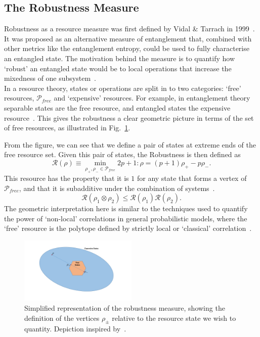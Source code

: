 \documentclass{standalone}
\begin{document}
\subsection{The Robustness Measure}\label{sec:robustnessmeasure}
Robustness as a resource measure was first defined by Vidal \& Tarrach in 1999~\cite{Vidal1999}. It was proposed as an alternative measure of entanglement that, combined with other metrics like the entanglement entropy, could be used to fully characterise an entangled state. The motivation behind the measure is to quantify how `robust' an entangled state would be to local operations that increase the mixedness of one subsystem~\cite{Vidal1999}.\\
In a resource theory, states or operations are split in to two categories: `free' resources, $\mathcal{P}_{free}$ and `expensive' resources. For example, in entanglement theory separable states are the free resource, and entangled states the expensive resource~\cite{Vidal1999}. This gives the robustness a clear geometric picture in terms of the set of free resources, as illustrated in Fig.~\ref{fig:robustshapes}.
\par
From the figure, we can see that we define a pair of states at extreme ends of the free resource set. Given this pair of states, the Robustness is then defined as~\cite{Vidal1999}
\begin{equation}\label{eq:robustness}
    \mathcal{R}(\rho)\equiv\min_{\rho_{+},\rho_{-}\in\mathcal{P}_{free}} 2p+1 : \rho = \left(p+1\right)\rho_{+} - p\rho_{-}.
\end{equation}
This resource has the property that it is $1$ for any state that forms a vertex of $\mathcal{P}_{free}$, and that it is subadditive under the combination of systems~\cite{Vidal1999,Howard2016}. 
\[\mathcal{R}(\rho_{1}\otimes\rho_{2})\leq \mathcal{R}(\rho_{1})\mathcal{R}(\rho_{2}).\]
The geometric interpretation here is similar to the techniques used to quantify the power of `non-local' correlations in general probabilistic models, where the `free' resource is the polytope defined by strictly local or `classical' correlation~\cite{Acin2006}.
\par
\begin{figure}[h]
    \centering
    \includegraphics[width=0.5\textwidth]{Figures/Robustness.pdf}
    \caption{Simplified representation of the robustness measure, showing the definition of the vertices $\rho_{\pm}$ relative to the resource state we wish to quantity. Depiction inspired by~\cite{Vidal1999,Howard2016}.}
\label{fig:robustshapes}
\end{figure}
\end{document}

